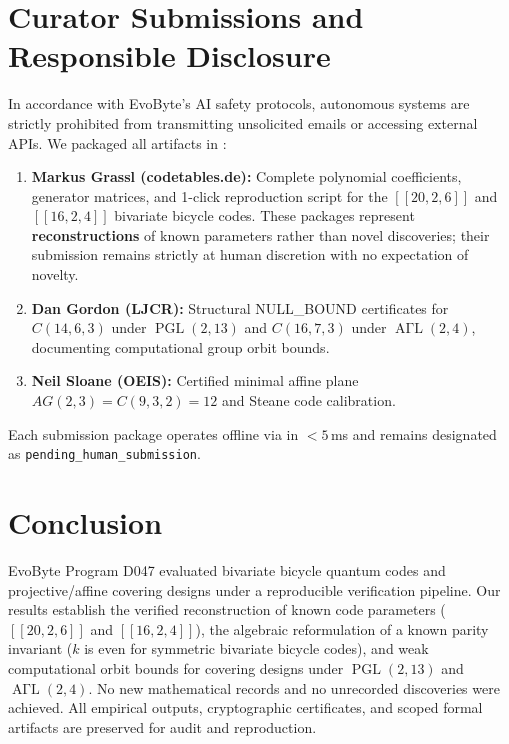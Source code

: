 \documentclass[11pt,a4paper]{article}
\begin{document}
\section{Curator Submissions and Responsible Disclosure}
\label{sec:curators}
In accordance with EvoByte's AI safety protocols, autonomous systems are strictly prohibited from transmitting unsolicited emails or accessing external APIs. We packaged all artifacts in :
\begin{enumerate}
    \item \textbf{Markus Grassl (codetables.de):} Complete polynomial coefficients, generator matrices, and 1-click reproduction script for the $[[20, 2, 6]]$ and $[[16, 2, 4]]$ bivariate bicycle codes. These packages represent \textbf{reconstructions} of known parameters rather than novel discoveries; their submission remains strictly at human discretion with no expectation of novelty.
    \item \textbf{Dan Gordon (LJCR):} Structural NULL\_BOUND certificates for $C(14, 6, 3)$ under $\operatorname{PGL}(2, 13)$ and $C(16, 7, 3)$ under $\operatorname{A\Gamma L}(2, 4)$, documenting computational group orbit bounds.
    \item \textbf{Neil Sloane (OEIS):} Certified minimal affine plane $AG(2, 3) = C(9, 3, 2) = 12$ and Steane code calibration.
\end{enumerate}
Each submission package operates offline via  in $< 5$\,ms and remains designated as \texttt{pending\_human\_submission}.

\section{Conclusion}
\label{sec:conclusion}
EvoByte Program D047 evaluated bivariate bicycle quantum codes and projective/affine covering designs under a reproducible verification pipeline. Our results establish the verified reconstruction of known code parameters ($[[20, 2, 6]]$ and $[[16, 2, 4]]$), the algebraic reformulation of a known parity invariant ($k$ is even for symmetric bivariate bicycle codes), and weak computational orbit bounds for covering designs under $\operatorname{PGL}(2, 13)$ and $\operatorname{A\Gamma L}(2, 4)$. No new mathematical records and no unrecorded discoveries were achieved. All empirical outputs, cryptographic certificates, and scoped formal artifacts are preserved for audit and reproduction.



\end{document}
